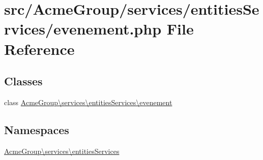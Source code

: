 \hypertarget{services_2entities_services_2evenement_8php}{\section{src/\+Acme\+Group/services/entities\+Services/evenement.php File Reference}
\label{services_2entities_services_2evenement_8php}
}
\subsection*{Classes}
\begin{DoxyCompactItemize}
\item 
class \hyperlink{class_acme_group_1_1services_1_1entities_services_1_1evenement}{Acme\+Group\textbackslash{}services\textbackslash{}entities\+Services\textbackslash{}evenement}
\end{DoxyCompactItemize}
\subsection*{Namespaces}
\begin{DoxyCompactItemize}
\item 
 \hyperlink{namespace_acme_group_1_1services_1_1entities_services}{Acme\+Group\textbackslash{}services\textbackslash{}entities\+Services}
\end{DoxyCompactItemize}
